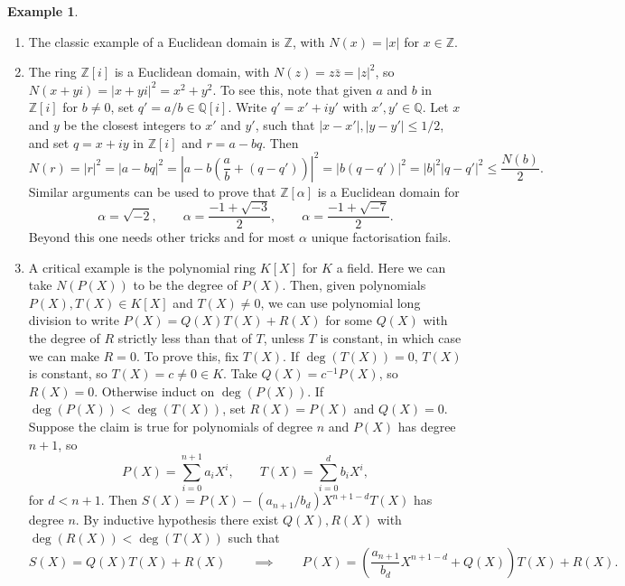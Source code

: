 \documentclass{article}
\newcommand{\Z}{\mathbb{Z}}
\newcommand{\Q}{\mathbb{Q}}
\newcommand{\rb}[1]{\left( #1 \right)}
\renewcommand{\sb}[1]{\left[ #1 \right]}
\newcommand{\abs}[1]{\left\lvert #1 \right\rvert}
\theoremstyle{definition}\newtheorem{definition}{Definition}[subsection]
\theoremstyle{definition}\newtheorem{remark}[definition]{Remark}
\theoremstyle{definition}\newtheorem*{example}{Example}
\theoremstyle{definition}\newtheorem*{note}{Note}
\begin{document}
\begin{example}
\hfill
\begin{enumerate}
\item The classic example of a Euclidean domain is $ \Z $, with $ N\rb{x} = \abs{x} $ for $ x \in \Z $.
\item The ring $ \Z\sb{i} $ is a Euclidean domain, with $ N\rb{z} = z\bar{z} = \abs{z}^2 $, so $ N\rb{x + yi} = \abs{x + yi}^2 = x^2 + y^2 $. To see this, note that given $ a $ and $ b $ in $ \Z\sb{i} $ for $ b \ne 0 $, set $ q' = a / b \in \Q\sb{i} $. Write $ q' = x' + iy' $ with $ x', y' \in \Q $. Let $ x $ and $ y $ be the closest integers to $ x' $ and $ y' $, such that $ \abs{x - x'}, \abs{y - y'} \le 1 / 2 $, and set $ q = x + iy $ in $ \Z\sb{i} $ and $ r = a - bq $. Then
$$ N\rb{r} = \abs{r}^2 = \abs{a - bq}^2 = \abs{a - b\rb{\dfrac{a}{b} + \rb{q - q'}}}^2 = \abs{b\rb{q - q'}}^2 = \abs{b}^2\abs{q - q'}^2 \le \dfrac{N\rb{b}}{2}. $$
Similar arguments can be used to prove that $ \Z\sb{\alpha} $ is a Euclidean domain for
$$ \alpha = \sqrt{-2}, \qquad \alpha = \dfrac{-1 + \sqrt{-3}}{2}, \qquad \alpha = \dfrac{-1 + \sqrt{-7}}{2}. $$
Beyond this one needs other tricks and for most $ \alpha $ unique factorisation fails.
\item A critical example is the polynomial ring $ K\sb{X} $ for $ K $ a field. Here we can take $ N\rb{P\rb{X}} $ to be the degree of $ P\rb{X} $. Then, given polynomials $ P\rb{X}, T\rb{X} \in K\sb{X} $ and $ T\rb{X} \ne 0 $, we can use polynomial long division to write $ P\rb{X} = Q\rb{X}T\rb{X} + R\rb{X} $ for some $ Q\rb{X} $ with the degree of $ R $ strictly less than that of $ T $, unless $ T $ is constant, in which case we can make $ R = 0 $. To prove this, fix $ T\rb{X} $. If $ \deg\rb{T\rb{X}} = 0 $, $ T\rb{X} $ is constant, so $ T\rb{X} = c \ne 0 \in K $. Take $ Q\rb{X} = c^{-1}P\rb{X} $, so $ R\rb{X} = 0 $. Otherwise induct on $ \deg\rb{P\rb{X}} $. If $ \deg\rb{P\rb{X}} < \deg\rb{T\rb{X}} $, set $ R\rb{X} = P\rb{X} $ and $ Q\rb{X} = 0 $. Suppose the claim is true for polynomials of degree $ n $ and $ P\rb{X} $ has degree $ n + 1 $, so
$$ P\rb{X} = \sum_{i = 0}^{n + 1} a_iX^i, \qquad T\rb{X} = \sum_{i = 0}^d b_iX^i, $$
for $ d < n + 1 $. Then $ S\rb{X} = P\rb{X} - \rb{a_{n + 1} / b_d}X^{n + 1 - d}T\rb{X} $ has degree $ n $. By inductive hypothesis there exist $ Q\rb{X}, R\rb{X} $ with $ \deg\rb{R\rb{X}} < \deg\rb{T\rb{X}} $ such that
$$ S\rb{X} = Q\rb{X}T\rb{X} + R\rb{X} \qquad \implies \qquad P\rb{X} = \rb{\dfrac{a_{n + 1}}{b_d}X^{n + 1 - d} + Q\rb{X}}T\rb{X} + R\rb{X}. $$
\end{enumerate}
\end{example}
\end{document}
